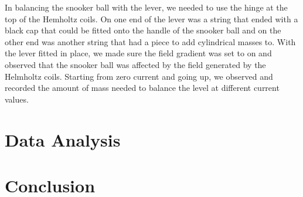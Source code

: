 \documentclass[aps,prl,10pt,twocolumn,floatfix]{revtex4-2}
\begin{document}
In balancing the snooker ball with the lever, we needed to use the hinge at the top of the Hemholtz coils.
On one end of the lever was a string that ended with a black cap that could be fitted onto the handle of the snooker ball and on the other end was another string that had a piece to add cylindrical masses to. 
With the lever fitted in place, we made sure the field gradient was set to on and observed that the snooker ball was affected by the field generated by the Helmholtz coils.
Starting from zero current and going up, we observed and recorded the amount of mass needed to balance the level at different current values. 

\section{Data Analysis}


\section{Conclusion}




\end{document}
